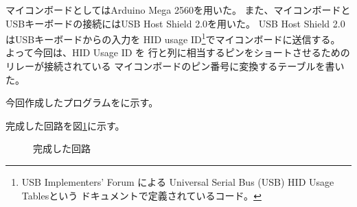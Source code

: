 マイコンボードとしてはArduino Mega 2560を用いた。
また、マイコンボードとUSBキーボードの接続にはUSB Host Shield 2.0を用いた。
USB Host Shield 2.0はUSBキーボードからの入力を
HID usage ID\footnote{USB Implementers' Forum による
Universal Serial Bus (USB) HID Usage Tablesという
ドキュメントで定義されているコード。}でマイコンボードに送信する。
よって今回は、HID Usage ID を
行と列に相当するピンをショートさせるためのリレーが接続されている
マイコンボードのピン番号に変換するテーブルを書いた。

今回作成したプログラムを\cite{bib:usb2bt}に示す。

完成した回路を図\ref{fig:btksemiall}に示す。

\begin{figure}[H]
\centering
\begin{minipage}{0.6\linewidth}
\caption{完成した回路}
\label{fig:btksemiall}
\end{minipage}
\end{figure}

